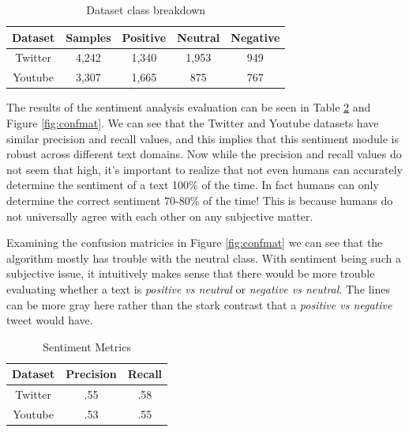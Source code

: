 \begin{table}[!ht]
\centering
\begin{tabular}{|c|c|c|c|c|} \hline
\textbf{Dataset} & \textbf{Samples} & \textbf{Positive} & \textbf{Neutral} &\textbf{Negative} \\ \hline \hline
Twitter & 4,242 & 1,340 & 1,953 & 949 \\ \hline
Youtube & 3,307 & 1,665 & 875 & 767 \\ \hline
\end{tabular}
\caption{Dataset class breakdown}
\label{tab:cdescr}
\end{table}

The results of the sentiment analysis evaluation can be seen in Table \ref{tab:smetric} and Figure \ref{fig:confmat}. We can see that the Twitter and Youtube datasets have similar precision and recall values, and this implies that this sentiment module is robust across different text domains.
Now while the precision and recall values do not seem that high, it's important to realize that not even humans can accurately determine the sentiment of a text 100\% of the time. In fact humans can only determine the correct sentiment 70-80\% \cite{sent2}\cite{sent1}\cite{mashable} of the time! This is because humans do not universally agree with each other on any subjective matter.

Examining the confusion matricies in Figure \ref{fig:confmat} we can see that the algorithm mostly has trouble with the neutral class. With sentiment being such a subjective issue, it intuitively makes sense that there would be more trouble evaluating whether a text is {\em positive vs neutral} or {\em negative vs neutral}. The lines can be more gray here rather than the stark contrast that a {\em positive vs negative} tweet would have. 

\begin{table}[!ht]
\centering
\begin{tabular}{|c|c|c|} \hline
\textbf{Dataset} & \textbf{Precision} & \textbf{Recall} \\ \hline \hline
Twitter & .55 & .58  \\ \hline
Youtube & .53 & .55 \\ \hline 
\end{tabular}
\caption{Sentiment Metrics}
\label{tab:smetric}
\end{table}

